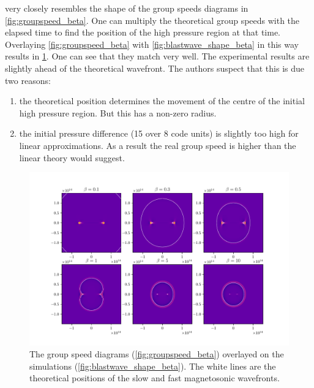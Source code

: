 \documentclass[a4paper]{article}
\numberwithin{figure}{section}
\numberwithin{equation}{section}
\begin{document}
 very closely resembles the shape of the group speeds diagrams in \cref{fig:groupspeed_beta}. 
One can multiply the theoretical group speeds with the elapsed time to find the position of the high pressure region at that time. 
Overlaying \cref{fig:groupspeed_beta} with \cref{fig:blastwave_shape_beta} in this way results in \cref{fig:comparison_groupspeed}. One can see that they match very well. 
The experimental results are slightly ahead of the theoretical wavefront. The authors suspect that this is due two reasons:
\begin{enumerate}
	\item the theoretical position determines the movement of the centre of the initial high pressure region. But this has a non-zero radius. 
	\item the initial pressure difference (15 over 8 code units) is slightly too high for linear approximations. As a result the real group speed is higher than the linear theory would suggest.
\end{enumerate}

\begin{figure}[h]
	\centering
	\includegraphics[width=\textwidth]{figures/comparison_groupspeed.pdf}
	\caption{The group speed diagrams (\cref{fig:groupspeed_beta}) overlayed on the simulations (\cref{fig:blastwave_shape_beta}). The white lines are the theoretical positions of the slow and fast magnetosonic wavefronts.}
	\label{fig:comparison_groupspeed}
\end{figure}
\end{document}
